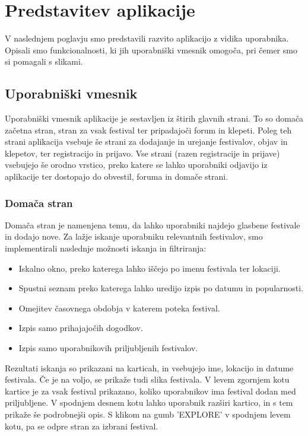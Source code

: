 \documentclass[a4paper,12pt,openright]{book}
\begin{document}
\chapter{Predstavitev aplikacije}
V naslednjem poglavju smo predstavili razvito aplikacijo z vidika uporabnika.
Opisali smo funkcionalnosti, ki jih uporabniški vmesnik omogoča, pri čemer smo si pomagali s slikami.

\section{Uporabniški vmesnik}
\label{UI}
Uporabniški vmesnik aplikacije je sestavljen iz štirih glavnih strani.
To so domača začetna stran, stran za vsak festival ter pripadajoči forum in klepeti.
Poleg teh strani aplikacija vsebuje še strani za dodajanje in urejanje festivalov, objav in klepetov, ter registracijo in prijavo.
Vse strani (razen registracije in prijave) vsebujejo še orodno vrstico, preko katere se lahko uporabniki odjavijo iz aplikacije ter dostopajo do obvestil, foruma in domače strani.

\subsection{Domača stran}
Domača stran je namenjena temu, da lahko uporabniki najdejo glasbene festivale in dodajo nove.
Za lažje iskanje uporabniku relevantnih festivalov, smo implementirali naslednje možnosti iskanja in filtriranja:
\begin{itemize}
    \item Iskalno okno, preko katerega lahko iščejo po imenu festivala ter lokaciji.
    \item Spustni seznam preko katerega lahko uredijo izpis po datumu in popularnosti.
    \item Omejitev časovnega obdobja v katerem poteka festival.
    \item Izpis samo prihajajočih dogodkov.
    \item Izpis samo uporabnikovih priljubljenih festivalov.
\end{itemize}

Rezultati iskanja so prikazani na karticah, in vsebujejo ime, lokacijo in datume festivala.
Če je na voljo, se prikaže tudi slika festivala.
V levem zgornjem kotu kartice je za vsak festival prikazano, koliko uporabnikov ima festival dodan med priljubljene.
V spodnjem desnem kotu lahko uporabnik razširi kartico, in s tem prikaže še podrobnejši opis.
S klikom na gumb 'EXPLORE' v spodnjem levem kotu, pa se odpre stran za izbrani festival.
\end{document}
